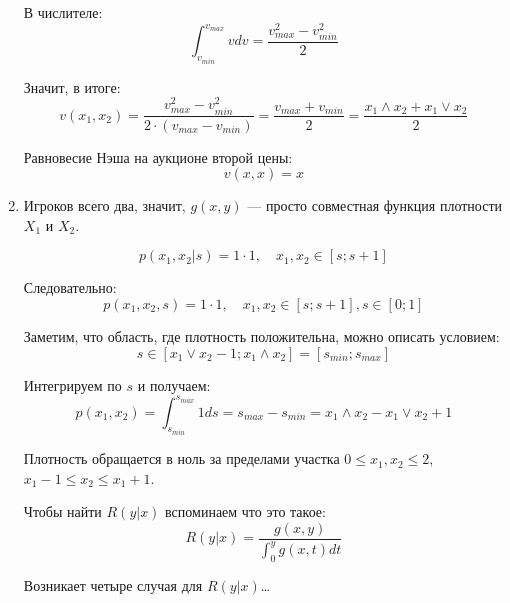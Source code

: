 \begin{enumerate}
В числителе:
\begin{equation}
\int_{v_{min}}^{v_{max}}vdv=\frac{v_{max}^{2}-v_{min}^{2}}{2}
\end{equation}

Значит, в итоге:
\begin{equation}
v(x_{1},x_{2})=\frac{v_{max}^{2}-v_{min}^{2}}{2\cdot (v_{max}-v_{min})}=\frac{v_{max}+v_{min}}{2}= \frac{x_{1}\wedge x_{2}+x_{1}\vee x_{2}}{2}
\end{equation}

Равновесие Нэша на аукционе второй цены:
\begin{equation}
v(x,x)=x
\end{equation}


\item Игроков всего два, значит, $ g(x,y) $ — просто совместная функция плотности $ X_{1} $ и $ X_{2} $.

\begin{equation}
p(x_{1},x_{2}|s)=1\cdot 1, \quad x_{1},x_{2}\in [s;s+1]
\end{equation}

Следовательно:
\begin{equation}
p(x_{1},x_{2},s)=1\cdot 1, \quad x_{1},x_{2}\in [s;s+1], s\in [0;1]
\end{equation}

Заметим, что область, где плотность положительна, можно описать условием:
\begin{equation}
s\in [x_{1}\vee x_{2}-1; x_{1}\wedge x_{2}]=[s_{min};s_{max}]
\end{equation}

Интегрируем по $ s $ и получаем:
\begin{equation}
p(x_{1},x_{2})=\int_{s_{min}}^{s_{max}} 1 ds= s_{max}-s_{min}=x_{1}\wedge x_{2}-x_{1}\vee x_{2}+1
\end{equation}

Плотность обращается в ноль за пределами участка $ 0\leq x_{1},x_{2}\leq 2 $, $ x_{1}-1\leq x_{2} \leq x_{1}+1 $.

Чтобы найти $ R(y|x) $ вспоминаем что это такое:
\begin{equation}
R(y|x)=\frac{g(x,y)}{\int_{0}^{y}g(x,t)dt}
\end{equation}

Возникает четыре случая для $ R(y|x) $\ldots



\end{enumerate}
